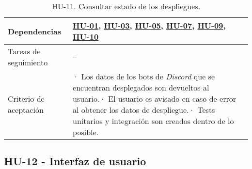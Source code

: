 \begin{table}[H]
\begin{adjustbox}{max width=\textwidth}
\begin{tabularx}{\textwidth}{|l|L|}
        Dependencias & \hyperref[sec:hu01]{HU-01}, \hyperref[sec:hu03]{HU-03}, \hyperref[sec:hu05]{HU-05}, \hyperref[sec:hu07]{HU-07}, \hyperref[sec:hu09]{HU-09}, \hyperref[sec:hu10]{HU-10} \\ \hline
        Tareas de seguimiento & – \\ \hline
        Criterio de aceptación & · Los datos de los bots de \textit{Discord} que se encuentran desplegados son devueltos al usuario.\linebreak · El usuario es avisado en caso de error al obtener los datos de despliegue.\linebreak · Tests unitarios y integración son creados dentro de lo posible. \\ \hline
    \end{tabularx}
    \end{adjustbox}
    \caption{HU-11. Consultar estado de los despliegues.}
\end{table}

\subsection{HU-12 - Interfaz de usuario}
\label{sec:hu12}

